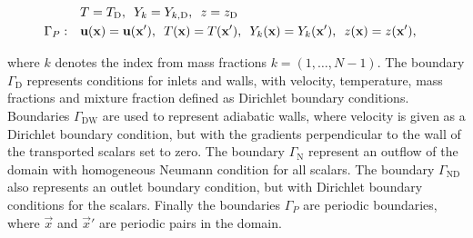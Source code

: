 \begin{subequations}
\begin{align}
		\,\,\,\notag                                                                                                                                                                                                \\
		 & T = T_{\text{D}},
		\,\,\,
		Y_{k} =  Y_{k,{\text{D}}},
		\,\,\,
		z = z_{\text{D}}
		\label{eq:bc_OD}                                                                                                                                                                                            \\
		\Gamma_{P}:\quad
		 & \vec{u}(\vec{x}) = \vec{u}(\vec{x}'),
		\,\,\,
		T(\vec{x}) = T(\vec{x}'),
		\,\,\,
		Y_{k}(\vec{x}) =  Y_{k}(\vec{x}'),
		\,\,\,
		z(\vec{x}) = z(\vec{x}'),
		\label{eq:bc_P}
	\end{align}
\end{subequations}

where $k$ denotes the index from mass fractions $k = (1,\dots,N-1)$. The boundary $\Gamma_\text{D}$ represents conditions for inlets and walls, with velocity, temperature, mass fractions and mixture fraction defined as Dirichlet boundary conditions. Boundaries $\Gamma_\text{DW}$  are used to represent adiabatic walls, where velocity is given as a Dirichlet boundary condition, but with the gradients perpendicular to the wall of the transported scalars set to zero. The boundary $\Gamma_\text{N}$ represent an outflow of the domain with homogeneous Neumann condition for all scalars. The boundary $\Gamma_{\text{ND}}$ also  represents an outlet boundary condition, but with Dirichlet boundary conditions for the scalars. Finally the boundaries $\Gamma_P$ are periodic boundaries, where $\vec{x}$ and $\vec{x}'$ are periodic pairs in the domain.

\mycomment{
}